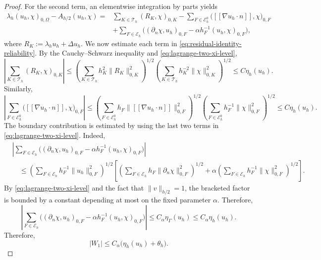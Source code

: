 \documentclass[10pt,a4paper]{amsart}
\begin{document}
\begin{proof}
For the second term, an elementwise integration by parts yields
\begin{align}
\lambda_h(u_h,\chi)_{0,\Omega}-A_{h/2}(u_h,\chi) =& \sum_{K\in\mathcal T_h}(R_K,\chi)_{0,K} -\sum_{F\in\mathcal E_h^0} \big([\![\nabla u_h\cdot n]\!],\chi\big)_{0,F} \nonumber\\
&+ \sum_{F\in\mathcal E_h} \Big( (\partial_n\chi,u_h)_{0,F} -\alpha h_F^{-1}(u_h,\chi)_{0,F} \Big),
\label{eq:residual-identity-reliability}
\end{align}
where $R_K:=\lambda_hu_h+\Delta u_h$. We now estimate each term in \eqref{eq:residual-identity-reliability}. By the Cauchy--Schwarz inequality and \eqref{eq:lagrange-two-xi-level},
\[
\left|\sum_{K\in\mathcal T_h}(R_K,\chi)_{0,K}\right| \leq \left( \sum_{K\in\mathcal T_h}h_K^2\|R_K\|_{0,K}^2 \right)^{1/2} \left(
\sum_{K\in\mathcal T_h}h_K^{-2}\|\chi\|_{0,K}^2 \right)^{1/2} \leq C\eta_h(u_h).\]
Similarly,
\[
\left| \sum_{F\in\mathcal E_h^0} \big([\![\nabla u_h\cdot n]\!],\chi\big)_{0,F} \right| \leq \left(\sum_{F\in\mathcal E_h^0}h_F
\|[\![\nabla u_h\cdot n]\!]\|_{0,F}^2 \right)^{1/2} \left( \sum_{F\in\mathcal E_h^0}h_F^{-1}\|\chi\|_{0,F}^2 \right)^{1/2} \leq C\eta_h(u_h).
\]
The boundary contribution is estimated by using the last two terms in
\eqref{eq:lagrange-two-xi-level}. Indeed,
\[
\begin{aligned}
&\left|\sum_{F\in\mathcal E_h} \Big( (\partial_n\chi,u_h)_{0,F} -\alpha h_F^{-1}(u_h,\chi)_{0,F} \Big) \right|\\
&\quad \le\left(\sum_{F\in\mathcal E_h}h_F^{-1}\|u_h\|_{0,F}^2\right)^{1/2}\left[\left(\sum_{F\in\mathcal E_h}h_F\|\partial_n\chi\|_{0,F}^2 \right)^{1/2} + \alpha \left( \sum_{F\in\mathcal E_h} h_F^{-1}\|\chi\|_{0,F}^2 \right)^{1/2} \right].
\end{aligned}
\]
By \eqref{eq:lagrange-two-xi-level} and the fact that
\(\|v\|_{h/2}=1\), the bracketed factor is bounded by a constant depending at most
on the fixed parameter \(\alpha\). Therefore,
\[
\left| \sum_{F\in\mathcal E_h} \Big( (\partial_n\chi,u_h)_{0,F} -\alpha h_F^{-1}(u_h,\chi)_{0,F} \Big) \right|\le C_\alpha \eta_\Gamma(u_h) \le C_\alpha \eta_h(u_h).
\]
Therefore,
\[
   |W_1| \leq C_\alpha\big(\eta_h(u_h)+\theta_h\big).
\]


\end{proof}
\end{document}

